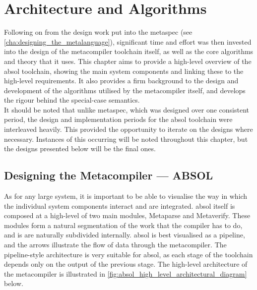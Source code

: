 
\chapter{Architecture and Algorithms} %
\label{cha:architecture_and_algorithms}
Following on from the design work put into the \gls{metaspec} (see \autoref{cha:designing_the_metalanguage}), significant time and effort was then invested into the design of the metacompiler toolchain itself, as well as the core algorithms and theory that it uses. 
This chapter aims to provide a high-level overview of the \gls{absol} toolchain, showing the main system components and linking these to the high-level requirements.
It also provides a firm background to the design and development of the algorithms utilised by the metacompiler itself, and develops the rigour behind the special-case semantics. \\

It should be noted that unlike \gls{metaspec}, which was designed over one consistent period, the design and implementation periods for the \gls{absol} toolchain were interleaved heavily.
This provided the opportunity to iterate on the designs where necessary.
Instances of this occurring will be noted throughout this chapter, but the designs presented below will be the final ones. 

\section{Designing the Metacompiler --- ABSOL} %
\label{sec:designing_the_metacompiler_absol}
As for any large system, it is important to be able to visualise the way in which the individual system components interact and are integrated. 
\gls{absol} itself is composed at a high-level of two main modules, Metaparse and Metaverify.
These modules form a natural segmentation of the work that the compiler has to do, and is are naturally subdivided internally.
\gls{absol} is best visualised as a pipeline, and the arrows illustrate the flow of data through the metacompiler.
The pipeline-style architecture is very suitable for \gls{absol}, as each stage of the toolchain depends only on the output of the previous stage.
The high-level architecture of the metacompiler is illustrated in \autoref{fig:absol_high_level_architectural_diagram} below.

